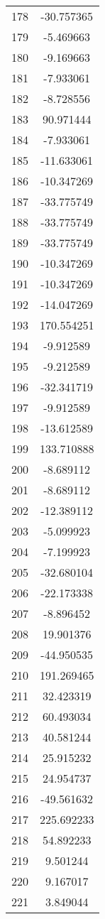 \documentclass[12pt]{article}
\begin{document}
\begin{longtable}{@{}cc@{}}
178 & -30.757365 \\
179 & -5.469663 \\
180 & -9.169663 \\
181 & -7.933061 \\
182 & -8.728556 \\
183 & 90.971444 \\
184 & -7.933061 \\
185 & -11.633061 \\
186 & -10.347269 \\
187 & -33.775749 \\
188 & -33.775749 \\
189 & -33.775749 \\
190 & -10.347269 \\
191 & -10.347269 \\
192 & -14.047269 \\
193 & 170.554251 \\
194 & -9.912589 \\
195 & -9.212589 \\
196 & -32.341719 \\
197 & -9.912589 \\
198 & -13.612589 \\
199 & 133.710888 \\
200 & -8.689112 \\
201 & -8.689112 \\
202 & -12.389112 \\
203 & -5.099923 \\
204 & -7.199923 \\
205 & -32.680104 \\
206 & -22.173338 \\
207 & -8.896452 \\
208 & 19.901376 \\
209 & -44.950535 \\
210 & 191.269465 \\
211 & 32.423319 \\
212 & 60.493034 \\
213 & 40.581244 \\
214 & 25.915232 \\
215 & 24.954737 \\
216 & -49.561632 \\
217 & 225.692233 \\
218 & 54.892233 \\
219 & 9.501244 \\
220 & 9.167017 \\
221 & 3.849044 \\

\end{longtable}
\end{document}
